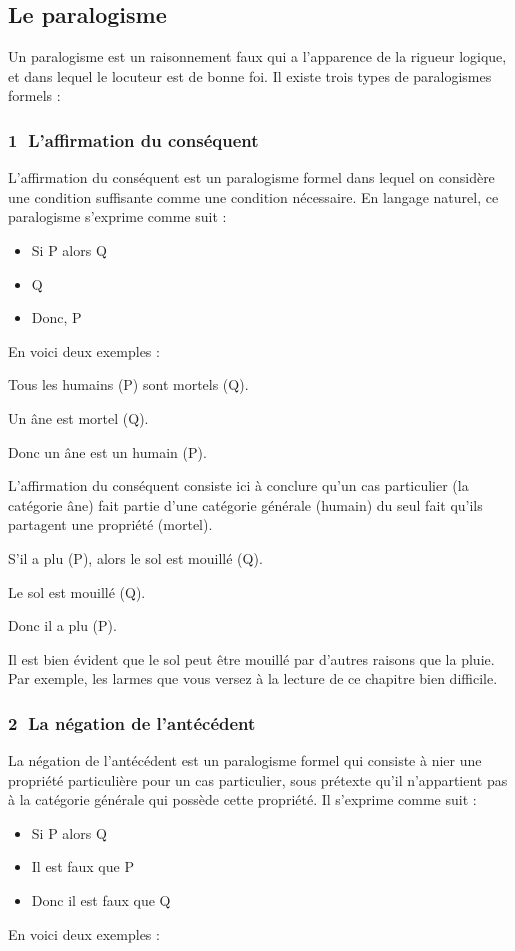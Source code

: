 \subsection{Le paralogisme}
Un paralogisme est un raisonnement faux qui a l’apparence de la rigueur logique, et dans lequel le locuteur est de bonne foi. Il existe trois types de paralogismes formels :

\subsubsection*{\textcircled{\scriptsize 1} L’affirmation du conséquent}
L’affirmation du conséquent est un paralogisme formel dans lequel on considère une condition suffisante comme une condition nécessaire. En langage naturel, ce paralogisme s’exprime comme suit :
\begin{itemize}[label=--]
\item Si P alors Q
\item Q
\item Donc, P
\end{itemize}
En voici deux exemples :

Tous les humains (P) sont mortels (Q).

Un âne est mortel (Q).

Donc un âne est un humain (P).

L’affirmation du conséquent consiste ici à conclure qu’un cas particulier (la catégorie âne) fait partie d’une catégorie générale (humain) du seul fait qu’ils partagent une propriété (mortel).

S’il a plu (P), alors le sol est mouillé (Q).

Le sol est mouillé (Q).

Donc il a plu (P).

Il est bien évident que le sol peut être mouillé par d’autres raisons que la pluie. Par exemple, les larmes que vous versez à la lecture de ce chapitre bien difficile.

\subsubsection*{\textcircled{\scriptsize 2} La négation de l’antécédent}
La négation de l’antécédent est un paralogisme formel qui consiste à nier une propriété particulière pour un cas particulier, sous prétexte qu’il n’appartient pas à la catégorie générale qui possède cette
propriété. Il s’exprime comme suit :
\begin{itemize}[label=--]
\item Si P alors Q
\item Il est faux que P
\item Donc il est faux que Q
\end{itemize}
En voici deux exemples :

